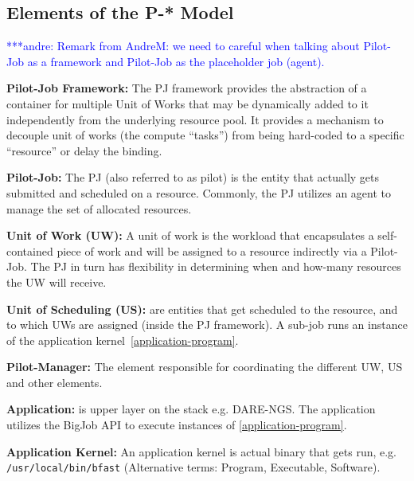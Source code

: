 \documentclass[conference,final]{IEEEtran}
\newcommand{\jhanote}[1]{ {\textcolor{red} { ***shantenu: #1 }}}
\newcommand{\alnote}[1]{ {\textcolor{blue} { ***andre: #1 }}}
\newcommand{\alnote}[1]{}
\newcommand{\jhanote}[1]{}
\begin{document}
\subsection{Elements of the P-* Model}

\alnote{Remark from AndreM: we need to careful when talking about
  Pilot-Job as a framework and Pilot-Job as the placeholder job
  (agent).}

\begin{compactenum}[A.]

\item \textbf{Pilot-Job Framework:} The PJ framework provides the
  abstraction of a container for multiple Unit of Works that may be
  dynamically added to it independently from the underlying resource
  pool.  It provides a mechanism to decouple unit of works (the
  compute ``tasks'') from being hard-coded to a specific ``resource''
  or delay the binding.

\item \textbf{Pilot-Job:} The PJ (also referred to as pilot) is the
  entity that actually gets submitted and scheduled on a resource. 
  Commonly, the PJ utilizes an agent to manage the
  set of allocated resources.

\item \textbf{Unit of Work (UW):} A unit of work is the workload that
  encapsulates a self-contained piece of work and will be assigned to
  a resource indirectly via a Pilot-Job.  The PJ in turn has
  flexibility in determining when and how-many resources the UW will
  receive.

\item \textbf{Unit of Scheduling (US):} are entities 
  that get scheduled to the resource, and to which UWs are assigned
  (inside the PJ framework). A sub-job runs an instance of the application
  kernel~\ref{application-program}.


\item \textbf{Pilot-Manager:} The element responsible for coordinating
  the different UW, US and other elements.


\item \textbf{Application:} is upper layer on the stack
  e.g. DARE-NGS. The application utilizes the BigJob API to execute
  instances of \ref{application-program}. \label{application}

\item \textbf{Application Kernel:} An application kernel is actual
  binary that gets run, e.g. \texttt{/usr/local/bin/bfast}
  (Alternative terms: Program, Executable,
  Software). \label{application-program}
	
\end{compactenum}
\end{document}
